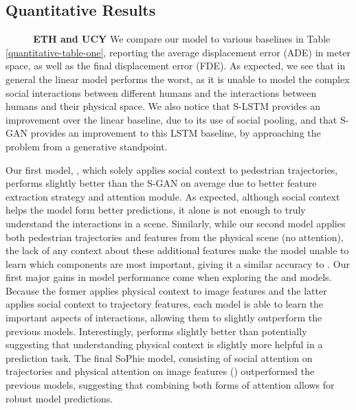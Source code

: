 \documentclass[10pt,twocolumn,letterpaper]{article}
\begin{document}
\subsection{Quantitative Results}
\textbf{~~~~~ETH and UCY} We compare our model to various baselines in Table \ref{quantitative-table-one}, reporting the average displacement error (ADE) in meter space, as well as the final displacement error (FDE). As expected, we see that in general the linear model performs the worst, as it is unable to model the complex social interactions between different humans and the interactions between humans and their physical space. 
We also notice that S-LSTM provides an improvement over the linear baseline, due to its use of social pooling, and that S-GAN provides an improvement to this LSTM baseline, by approaching the problem from a generative standpoint.

Our first model, , which solely applies social context to pedestrian trajectories, performs slightly better than the S-GAN on average due to better feature extraction strategy and attention module. As expected, although social context helps the model form better predictions, it alone is not enough to truly understand the interactions in a scene. Similarly, while our second model  applies both pedestrian trajectories and features from the physical scene (no attention), the lack of any context about these additional features make the model unable to learn which components are most important, giving it a similar accuracy to . Our first major gains in model performance come when exploring the  and  models. Because the former applies physical context to image features and the latter applies social context to trajectory features, each model is able to learn the important aspects of interactions, allowing them to slightly outperform the previous models. Interestingly,  performs slightly better than  potentially suggesting that understanding physical context is slightly more helpful in a prediction task. The final SoPhie model, consisting of social attention on trajectories and physical attention on image features () outperformed the previous models, suggesting that combining both forms of attention allows for robust model predictions.\\
\end{document}
